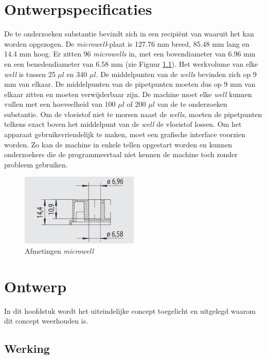 \documentclass[a4paper,twoside,kulak]{kulakreport} %
\begin{document}
\chapter{Ontwerpspecificaties}
De te onderzoeken substantie bevindt zich in een recipiënt van waaruit het kan worden opgezogen. De \textit{microwell}-plaat is 127.76 mm breed, 85.48 mm lang en 14.4 mm hoog. Er zitten 96 \textit{microwells} in, met een bovendiameter van 6.96 mm en een benedendiameter van 6.58 mm (zie Figuur \ref{fig: afmetingenMicrowellplaat}). Het werkvolume van elke \textit{well} is tussen 25 $\mu l$ en 340 $\mu l$. De middelpunten van de \textit{wells} bevinden zich op 9 mm van elkaar. De middelpunten van de pipetpunten moeten dus op 9 mm van elkaar zitten en moeten verwijderbaar zijn. De machine moet elke \textit{well} kunnen vullen met een hoeveelheid van 100 $\mu l$ of 200 $\mu l$ van de te onderzoeken substantie. Om de vloeistof niet te morsen naast de \textit{wells}, moeten de pipetpunten telkens exact boven het middelpunt van de \textit{well} de vloeistof lossen. Om het apparaat gebruiksvriendelijk te maken, moet een grafische interface voorzien worden. Zo kan de machine in enkele tellen opgestart worden en kunnen onderzoekers die de programmeertaal niet kennen de machine toch zonder probleem gebruiken.

\begin{figure}[h]
	\centering
	\includegraphics[width=0.5\textwidth]{AfmetingenMicrowell.png}
	\caption{Afmetingen \textit{microwell}}
	\label{fig: afmetingenMicrowellplaat}
	
\end{figure} 


\chapter{Ontwerp} 


In dit hoofdstuk wordt het uiteindelijke concept toegelicht en uitgelegd waarom dit concept weerhouden is.

\section{Werking}
\end{document}
